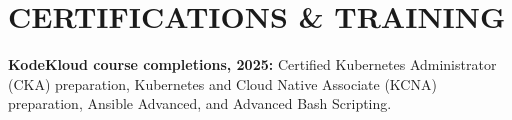 \section{CERTIFICATIONS \& TRAINING}

\textbf{KodeKloud course completions, 2025:} Certified Kubernetes Administrator (CKA) preparation, Kubernetes and Cloud Native Associate (KCNA) preparation, Ansible Advanced, and Advanced Bash Scripting.
